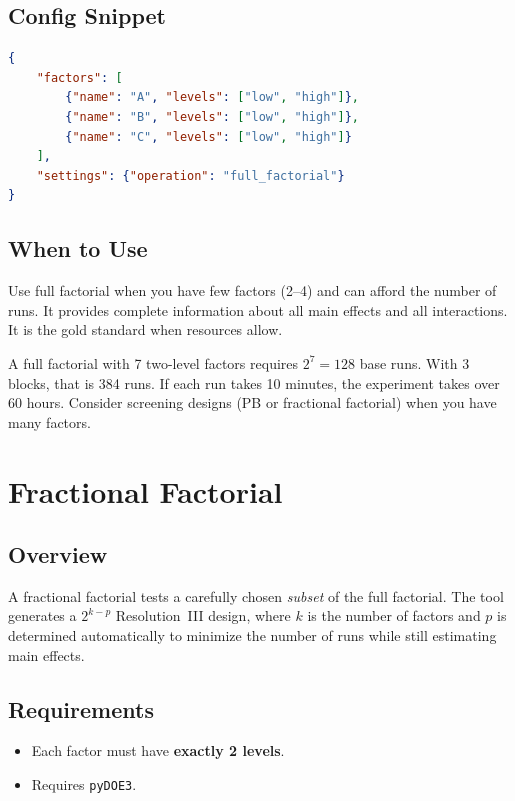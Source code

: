 \documentclass[11pt]{book}
\begin{document}
\subsection{Config Snippet}

\begin{lstlisting}[language=json]
{
    "factors": [
        {"name": "A", "levels": ["low", "high"]},
        {"name": "B", "levels": ["low", "high"]},
        {"name": "C", "levels": ["low", "high"]}
    ],
    "settings": {"operation": "full_factorial"}
}
\end{lstlisting}

\subsection{When to Use}

Use full factorial when you have few factors (2--4) and can afford the number of runs. It provides complete information about all main effects and all interactions. It is the gold standard when resources allow.

\begin{warning}
A full factorial with 7 two-level factors requires $2^7 = 128$ base runs. With 3 blocks, that is 384 runs. If each run takes 10 minutes, the experiment takes over 60 hours. Consider screening designs (PB or fractional factorial) when you have many factors.
\end{warning}

\section{Fractional Factorial}

\subsection{Overview}

A fractional factorial tests a carefully chosen \emph{subset} of the full factorial. The tool generates a $2^{k-p}$ Resolution~III design, where $k$ is the number of factors and $p$ is determined automatically to minimize the number of runs while still estimating main effects.

\subsection{Requirements}
\begin{itemize}[nosep]
  \item Each factor must have \textbf{exactly 2 levels}.
  \item Requires \texttt{pyDOE3}.
\end{itemize}
\end{document}
